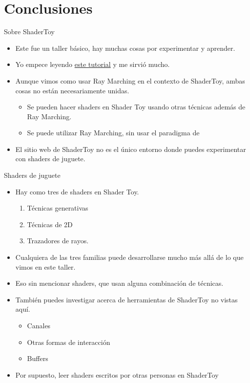\section{Conclusiones}

\begin{frame}{Sobre ShaderToy}
\begin{itemize}
    \item Este fue un taller básico, hay muchas cosas por experimentar y aprender.
    \item Yo empece leyendo \href{https://inspirnathan.com/posts/47-shadertoy-tutorial-part-1}{este tutorial} y me sirvió mucho.
    \item Aunque vimos como usar Ray Marching en el contexto de ShaderToy, ambas cosas no están necesariamente unidas.
    \begin{itemize}
        \item Se pueden hacer shaders en Shader Toy usando otras técnicas además de Ray Marching.
        \item Se puede utilizar Ray Marching, sin usar el paradigma de 
    \end{itemize}
    \item El sitio web de ShaderToy no es el único entorno donde puedes experimentar con shaders de juguete.
\end{itemize}
\end{frame}

\begin{frame}{Shaders de juguete}
\begin{itemize}
     \item Hay como tres  de shaders en Shader Toy.
     \begin{enumerate}
        \item Técnicas generativas
        \item Técnicas de 2D
        \item Trazadores de rayos.         
     \end{enumerate}
     \item Cualquiera de las tres familias puede desarrollarse mucho más allá de lo que vimos en este taller.
     \item Eso sin mencionar shaders, que usan alguna combinación de técnicas.
     \item También puedes investigar acerca de herramientas de ShaderToy no vistas aquí.
     \begin{itemize}
        \item Canales
        \item Otras formas de interacción
        \item Buffers  
     \end{itemize}
     \item Por supuesto, leer shaders escritos por otras personas en ShaderToy
 \end{itemize}
\end{frame}


